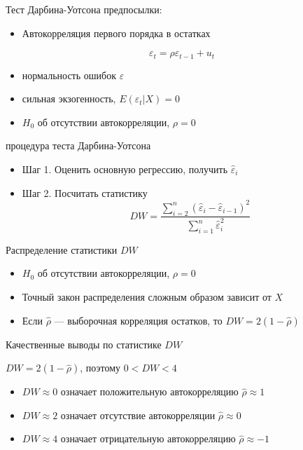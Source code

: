 \documentclass[ignorenonframetext,]{beamer}
\begin{document}
\begin{frame}{Тест Дарбина-Уотсона предпосылки:}

\begin{itemize}
\itemsep1pt\parskip0pt
\item
  Автокорреляция первого порядка в остатках
\end{itemize}

\[
\varepsilon_t=\rho \varepsilon_{t-1} + u_t
\]

\begin{itemize}
\item
  нормальность ошибок $\varepsilon$
\item
  сильная экзогенность, $E(\varepsilon_t | X)=0$
\item
  $H_0$ об отсутствии автокорреляции, $\rho=0$
\end{itemize}

\end{frame}

\begin{frame}{процедура теста Дарбина-Уотсона}

\begin{itemize}
\item
  Шаг 1. Оценить основную регрессию, получить $\hat{\varepsilon}_i$
\item
  Шаг 2. Посчитать статистику
  \[DW=\frac{\sum_{i=2}^n(\hat{\varepsilon}_i-\hat{\varepsilon}_{i-1})^2}{\sum_{i=1}^n \hat{\varepsilon}_i^2}\]
\end{itemize}

\end{frame}

\begin{frame}{Распределение статистики $DW$}

\begin{itemize}
\item
  $H_0$ об отсутствии автокорреляции, $\rho=0$
\item
  Точный закон распределения сложным образом зависит от $X$
\item
  Если $\hat{\rho}$ --- выборочная корреляция остатков, то
  $DW=2(1-\hat{\rho})$
\end{itemize}

\end{frame}

\begin{frame}{Качественные выводы по статистике $DW$}

$DW=2(1-\hat{\rho})$, поэтому $0<DW<4$

\begin{itemize}
\item
  $DW\approx 0$ означает положительную автокорреляцию
  $\hat{\rho}\approx 1$
\item
  $DW\approx 2$ означает отсутствие автокорреляции $\hat{\rho}\approx 0$
\item
  $DW\approx 4$ означает отрицательную автокорреляцию
  $\hat{\rho}\approx -1$
\end{itemize}

\end{frame}
\end{document}
